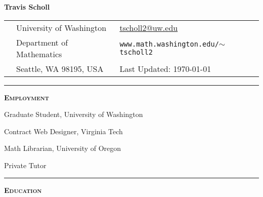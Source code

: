 \documentclass[12pt]{article}
\newcommand{\sectionheading}[1]
{
\bigskip %
\noindent
\hspace{-6.5mm}\textcolor{Gray}{\rule[.75mm]{21.5mm}{1mm}} %
\hspace{.2mm}	%
{\large{\textbf{\textsc{#1}}}} %
}
\newenvironment{date_section}
	{
	\vspace{-1ex}
	\leftmargini = 15ex
		\begin{itemize}[
			labelsep = *,
			labelwidth = 9ex,
			labelindent = 0ex,
			itemindent = !,
			font=\normalfont,
			align=parleft
		]{}
		\itemsep=-1.5mm
	}
	{\end{itemize}\vspace{-2ex}}
\newcommand{\yearrange}[2]{
	\item[
		{\makebox[1ex][r]{#1}}
		--
		{\makebox[1ex][l]{#2} }
		] }
\begin{document}

	\thispagestyle{empty}

	\centerline{{\LARGE \textbf{Travis Scholl}}}

	\vspace{3mm}

	\begin{center}
		\begin{tabular}[c]{lll} %
			\phantom{aaaaaaaaa} %
			& University of Washington
				& \url{tscholl2@uw.edu} \\
 			& Department of Mathematics
				& \texttt{www.math.washington.edu/$\sim$tscholl2}\\
 			& Seattle, WA 98195, USA
				& Last Updated: \today
		\end{tabular}
	\end{center}


	\sectionheading{Employment}%

		\begin{date_section}

			\yearrange{2013}{} Graduate Student,  University of Washington

			\yearrange{2013}{2014} Contract Web Designer, Virginia Tech

			\yearrange{2012}{2013} Math Librarian, University of Oregon

			\yearrange{2007}{2013} Private Tutor





		\end{date_section}

	\sectionheading{Education}%
\end{document}

